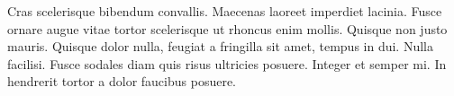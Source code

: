 Cras scelerisque bibendum convallis. Maecenas laoreet imperdiet lacinia. Fusce ornare augue vitae tortor scelerisque ut rhoncus enim mollis. Quisque non justo mauris. Quisque dolor nulla, feugiat a fringilla sit amet, tempus in dui. Nulla facilisi. Fusce sodales diam quis risus ultricies posuere. Integer et semper mi. In hendrerit tortor a dolor faucibus posuere.
